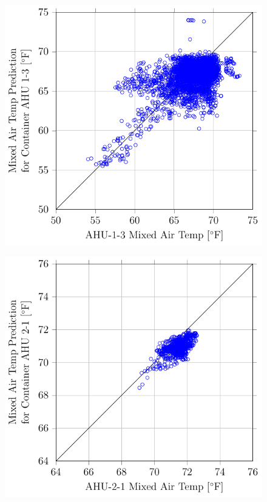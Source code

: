 \begin{figure}
\centering
\includegraphics[]{Plots/2016-09-07-1346-MixedAirTempPredictionforContainerAHU13vsAHU13MixedAirTemp.pdf}
\caption{}
\label{fig:2016-09-07-1346-MixedAirTempPredictionforContainerAHU13vsAHU13MixedAirTemp}
\end{figure}

\begin{figure}
\centering
\includegraphics[]{Plots/2016-09-07-1357-MixedAirTempPredictionforContainerAHU21vsAHU21MixedAirTemp.pdf}
\caption{}
\label{fig:2016-09-07-1357-MixedAirTempPredictionforContainerAHU21vsAHU21MixedAirTemp}
\end{figure}

